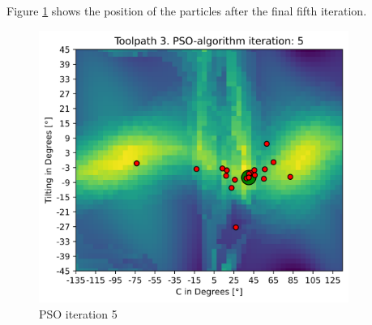 Figure \ref{5_true} shows the position of the particles after the final fifth iteration.

\begin{figure}[H]
	\centerline{\includegraphics[width=0.9\textwidth]{figures/swarm_true/3_5.png}}
	\caption{PSO iteration 5}
	\label{5_true}
\end{figure}

